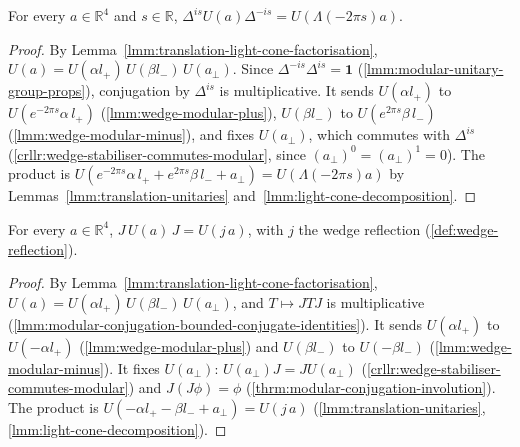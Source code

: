 \begin{lemma}
    \label{lmm:wedge-modular-group-translations}
    \leanok
    For every $a \in \mathbb{R}^4$ and $s \in \mathbb{R}$, $\Delta^{is}U(a)\Delta^{-is} = U(\Lambda(-2\pi s)a)$.
\end{lemma}
\begin{proof}
    \leanok
    By Lemma~\ref{lmm:translation-light-cone-factorisation}, $U(a) = U(\alpha l_+)\,U(\beta l_-)\,U(a_\perp)$. Since $\Delta^{-is}\Delta^{is} = \mathbf{1}$ (\ref{lmm:modular-unitary-group-props}), conjugation by $\Delta^{is}$ is multiplicative. It sends $U(\alpha l_+)$ to $U(e^{-2\pi s}\alpha\,l_+)$ (\ref{lmm:wedge-modular-plus}), $U(\beta l_-)$ to $U(e^{2\pi s}\beta\,l_-)$ (\ref{lmm:wedge-modular-minus}), and fixes $U(a_\perp)$, which commutes with $\Delta^{is}$ (\ref{crllr:wedge-stabiliser-commutes-modular}, since $(a_\perp)^0 = (a_\perp)^1 = 0$). The product is $U(e^{-2\pi s}\alpha\,l_+ + e^{2\pi s}\beta\,l_- + a_\perp) = U(\Lambda(-2\pi s)a)$ by Lemmas~\ref{lmm:translation-unitaries} and~\ref{lmm:light-cone-decomposition}.
\end{proof}

\begin{lemma}
    \label{lmm:wedge-modular-conjugation-translations}
    \leanok
    For every $a \in \mathbb{R}^4$, $J\,U(a)\,J = U(j\,a)$, with $j$ the wedge reflection (\ref{def:wedge-reflection}).
\end{lemma}
\begin{proof}
    \leanok
    By Lemma~\ref{lmm:translation-light-cone-factorisation}, $U(a) = U(\alpha l_+)\,U(\beta l_-)\,U(a_\perp)$, and $T \mapsto JTJ$ is multiplicative (\ref{lmm:modular-conjugation-bounded-conjugate-identities}). It sends $U(\alpha l_+)$ to $U(-\alpha l_+)$ (\ref{lmm:wedge-modular-plus}) and $U(\beta l_-)$ to $U(-\beta l_-)$ (\ref{lmm:wedge-modular-minus}). It fixes $U(a_\perp)$: $U(a_\perp)J = JU(a_\perp)$ (\ref{crllr:wedge-stabiliser-commutes-modular}) and $J(J\phi) = \phi$ (\ref{thrm:modular-conjugation-involution}). The product is $U(-\alpha l_+ - \beta l_- + a_\perp) = U(j\,a)$ (\ref{lmm:translation-unitaries}, \ref{lmm:light-cone-decomposition}).
\end{proof}

